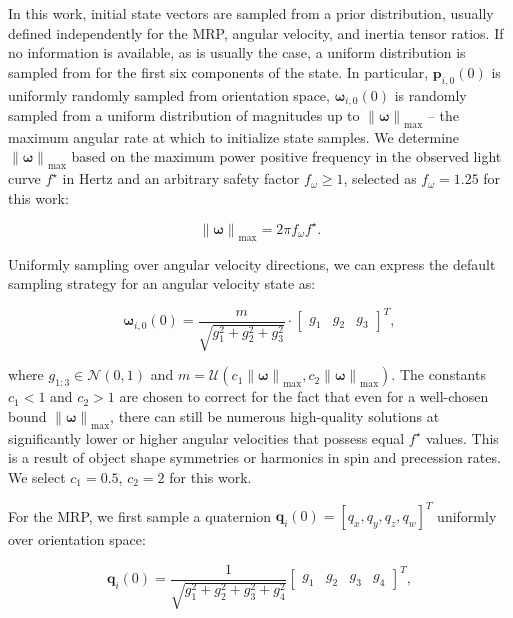 \documentclass[a4paper,twocolumn]{spaceDebrisC} %
\newcommand{\vctr}[1]{\bm{#1}}
\newcommand{\norm}[1]{\left\lVert#1\right\rVert}
\begin{document}
In this work, initial state vectors are sampled from a prior distribution, usually defined independently for the MRP, angular velocity, and inertia tensor ratios. If no information is available, as is usually the case, a uniform distribution is sampled from for the first six components of the state. In particular, $\vctr{p}_{i,0}(0)$ is uniformly randomly sampled from orientation space, $\vctr{\omega}_{i,0}(0)$ is randomly sampled from a uniform distribution of magnitudes up to $\norm{\vctr{\omega}}_\text{max}$ -- the maximum angular rate at which to initialize state samples. We determine $\norm{\vctr{\omega}}_\text{max}$ based on the maximum power positive frequency in the observed light curve $f^\star$ in Hertz and an arbitrary safety factor $f_\omega \geq 1$, selected as $f_\omega = 1.25$ for this work:

\begin{equation} \label{eq:ang_vel_max}
  \norm{\vctr{\omega}}_\text{max} = 2\pi f_\omega f^\star.
\end{equation}

Uniformly sampling over angular velocity directions, we can express the default sampling strategy for an angular velocity state as:

\begin{equation} \label{eq:omega_sampler}
  \vctr{\omega}_{i,0}(0) = \frac{m}{\sqrt{g_1^2+g_2^2+g_3^2}} \cdot \begin{bmatrix} g_1 & g_2 & g_3 \end{bmatrix}^T,
\end{equation}

\noindent
where $g_{1:3} \in \mathcal{N}(0,1)$ and $m=\mathcal{U}(c_1 \norm{\vctr{\omega}}_\text{max}, c_2 \norm{\vctr{\omega}}_\text{max})$. The constants $c_1<1$ and $c_2>1$ are chosen to correct for the fact that even for a well-chosen bound $\norm{\vctr{\omega}}_\text{max}$, there can still be numerous high-quality solutions at significantly lower or higher angular velocities that possess equal $f^\star$ values. This is a result of object shape symmetries or harmonics in spin and precession rates. We select $c_1=0.5$, $c_2=2$ for this work.

For the MRP, we first sample a quaternion $\vctr{q}_i(0) = [q_x, q_y, q_z, q_w]^T$ uniformly over orientation space:

\begin{equation}
  \vctr{q}_i(0) = \frac{1}{\sqrt{g_1^2 + g_2^2 + g_3^2 + g_4^2}} \begin{bmatrix} g_1 & g_2 & g_3 & g_4 \end{bmatrix}^T,
\end{equation}
\end{document}
